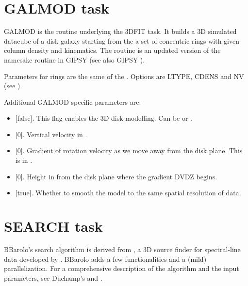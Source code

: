 \documentclass[letterpaper,10pt,english]{sphinxmanual}
\begin{document}
\section{GALMOD task}
\label{\detokenize{tasks:galmodtask}}\label{\detokenize{tasks:galmod-task}}
GALMOD is the routine underlying the 3DFIT task. It builds a 3D simulated datacube of a disk galaxy starting from the a set of concentric rings with given column density and kinematics. The routine is an updated version of the namesake routine in GIPSY (see also GIPSY ).

Parameters for rings are the same of the {\hyperref[\detokenize{tasks:ringio}]{}}. Options are LTYPE, CDENS and NV (see {\hyperref[\detokenize{tasks:dfitopt}]{}}).

Additional GALMOD-specific parameters are:
\begin{itemize}
\item {} 
 {[}false{]}. This flag enables the 3D disk modelling. Can be  or .

\item {} 
 {[}0{]}. Vertical velocity in .

\item {} 
 {[}0{]}. Gradient of rotation velocity as we move away from the disk plane. This is in .

\item {} 
 {[}0{]}. Height in  from the disk plane where the gradient DVDZ begins.

\item {} 
 {[}true{]}. Whether to smooth the model to the same spatial resolution of data.

\end{itemize}


\section{SEARCH task}
\label{\detokenize{tasks:search-task}}\label{\detokenize{tasks:searchtask}}
BBarolo’s search algorithm is derived from , a 3D source finder for spectral-line data developed by . BBarolo adds a few functionalities and a (mild) parallelization. For a comprehensive description of the algorithm and the input parameters, see Duchamp’s  and .
\end{document}
